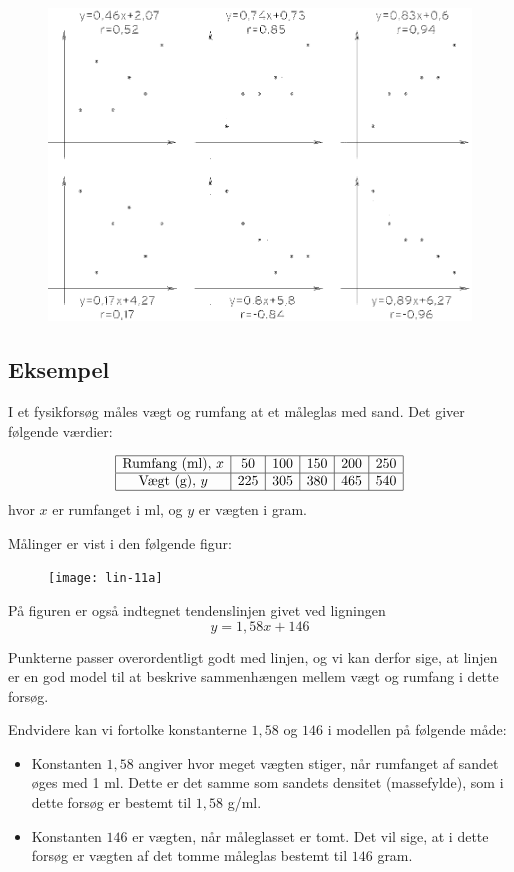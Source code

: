 \documentclass[12pt,oneside,a4paper]{article}
\begin{document}
\begin{figure}[H]
    \centering
    \includegraphics[width=\textwidth]{fig57}
\end{figure}

\subsection{Eksempel}
I et fysikforsøg måles vægt og rumfang at et måleglas med sand. Det giver følgende værdier:

\[
\begin{array}{|c|c|c|c|c|c|}
    \hline
    \mbox{Rumfang (ml)},\, x &  50 &  100 &  150 &  200 &  250  \\
    \hline
    \mbox{Vægt (g)},\, y &  225 &   305 &  380 &  465 &  540 \\
    \hline
\end{array}
\]
hvor $x$ er rumfanget i ml, og $y$ er vægten i gram.

Målinger er vist i den følgende figur:

\begin{figure}[H]
    \centering
    \texttt{[image: lin-11a]}
\end{figure}

På figuren er også indtegnet tendenslinjen givet ved ligningen
\[
    y=1,58 x + 146
\]

Punkterne passer overordentligt godt med linjen, og vi kan derfor sige, at linjen er en god model
til at beskrive sammenhængen mellem vægt og rumfang i dette forsøg.

Endvidere kan vi fortolke konstanterne $1,58$ og $146$ i modellen på følgende måde:
\begin{itemize}
    \item Konstanten $1,58$ angiver hvor meget vægten stiger, når rumfanget af
        sandet øges med 1 ml. Dette er det samme som sandets densitet
        (massefylde), som i dette forsøg er bestemt til $1,58$ g/ml.
    \item Konstanten $146$ er vægten, når måleglasset er tomt. Det vil sige, at
        i dette forsøg er vægten af det tomme måleglas bestemt til $146$ gram.
\end{itemize}
\end{document}
